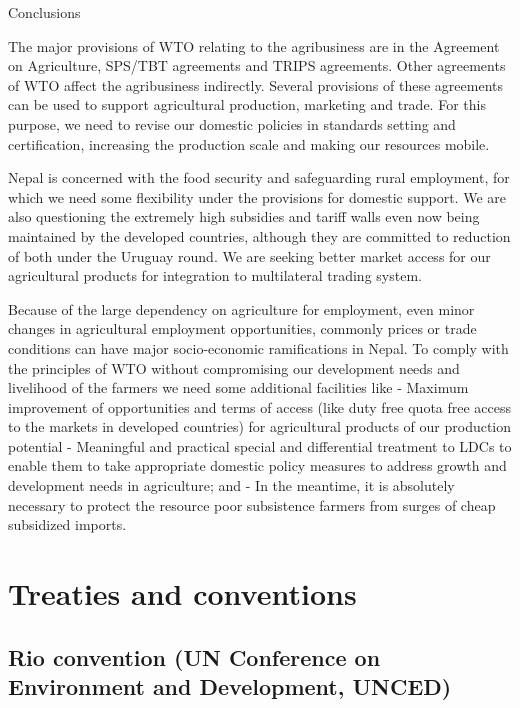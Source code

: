 \documentclass[
  openany]{book}
\begin{document}
Conclusions

The major provisions of WTO relating to the agribusiness are in the Agreement on Agriculture, SPS/TBT agreements and TRIPS agreements. Other agreements of WTO affect the agribusiness indirectly. Several provisions of these agreements can be used to support agricultural production, marketing and trade. For this purpose, we need to revise our domestic policies in standards setting and certification, increasing the production scale and making our resources mobile.

Nepal is concerned with the food security and safeguarding rural employment, for which we need some flexibility under the provisions for domestic support. We are also questioning the extremely high subsidies and tariff walls even now being maintained by the developed countries, although they are committed to reduction of both under the Uruguay round. We are seeking better market access for our agricultural products for integration to multilateral trading system.

Because of the large dependency on agriculture for employment, even minor changes in agricultural employment opportunities, commonly prices or trade conditions can have major socio-economic ramifications in Nepal. To comply with the principles of WTO without compromising our development needs and livelihood of the farmers we need some additional facilities like
- Maximum improvement of opportunities and terms of access (like duty free quota free access to the markets in developed countries) for agricultural products of our production potential
- Meaningful and practical special and differential treatment to LDCs to enable them to take appropriate domestic policy measures to address growth and development needs in agriculture; and
- In the meantime, it is absolutely necessary to protect the resource poor subsistence farmers from surges of cheap subsidized imports.

\hypertarget{treaties-and-conventions}{%
\section{Treaties and conventions}\label{treaties-and-conventions}}

\hypertarget{rio-convention-un-conference-on-environment-and-development-unced}{%
\subsection{Rio convention (UN Conference on Environment and Development, UNCED)}\label{rio-convention-un-conference-on-environment-and-development-unced}}
\end{document}
